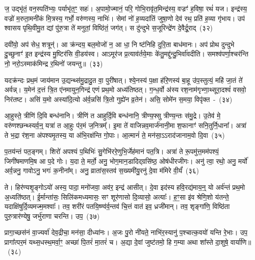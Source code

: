 ज॒ उद्भृ॑तं॒ वन॒स्पति॑भ्यः॒ पर्याभृ॑त॒ꣳ॒ सहः॑। अ॒पामो॒ज्मानं॒ परि॒ गोभि॒रावृ॑त॒मिन्द्र॑स्य॒ वज्रꣳ॑ ह॒विषा॒ रथं॑ यज। इन्द्र॑स्य॒ वज्रो॑ म॒रुता॒मनी॑कं मि॒त्रस्य॒ गर्भो॒ वरु॑णस्य॒ नाभिः॑। सेमां नो॑ ह॒व्यदा॑तिं जुषा॒णो देव॑ रथ॒ प्रति॑ ह॒व्या गृ॑भाय। उप॑ श्वासय पृथि॒वीमु॒त द्यां पु॑रु॒त्रा ते॑ मनुतां॒ विष्ठि॑तं॒ जग॑त्। स दु॑न्दुभे स॒जूरिन्द्रे॑ण दे॒वैर्दू॒राद्~(३२)\ip

दवी॑यो॒ अप॑ सेध॒ शत्रून्॑। आ क्र॑न्दय॒ बल॒मोजो॑ न॒ आ धा॒ नि ष्ट॑निहि दुरि॒ता बाध॑मानः। अप॑ प्रोथ दुन्दुभे दु॒च्छुनाꣳ॑ इ॒त इन्द्र॑स्य मु॒ष्टिर॑सि वी॒डय॑स्व। आऽमूर॑ज प्र॒त्याव॑र्तये॒माः के॑तु॒मद्दु॑न्दु॒भिर्वा॑वदीति। समश्व॑पर्णा॒श्चर॑न्ति नो॒ नरो॒\-ऽस्माक॑मिन्द्र र॒थिनो॑ जयन्तु॥~(३३)\ip

{\anuvakamend[{धन्व॑न्महि॒मानं॒ ब्राह्म॑णा॒सो\-ऽदि॑तिः पृथि॒व्याः परि॑ दू॒रादेक॑चत्वारिꣳशच्च}]}

यदक्र॑न्दः प्रथ॒मं जाय॑मान उ॒द्यन्थ्स॑मु॒द्रादु॒त वा॒ पुरी॑षात्। श्ये॒नस्य॑ प॒क्षा ह॑रि॒णस्य॑ बा॒हू उ॑प॒स्तुत्यं॒ महि॑ जा॒तं ते॑ अर्वन्न्। य॒मेन॑ द॒त्तं त्रि॒त ए॑नमायुन॒गिन्द्र॑ एणं प्रथ॒मो अध्य॑तिष्ठत्। ग॒न्ध॒र्वो अ॑स्य रश॒नाम॑गृभ्णा॒थ्सूरा॒दश्वं॑ वसवो॒ निर॑तष्ट। असि॑ य॒मो अस्या॑दि॒त्यो अ॑र्व॒न्नसि॑ त्रि॒तो गुह्ये॑न व्र॒तेन॑। असि॒ सोमे॑न स॒मया॒ विपृ॑क्त~-~(३४)\ip

आ॒हुस्ते॒ त्रीणि॑ दि॒वि बन्ध॑नानि। त्रीणि॑ त आहुर्दि॒वि बन्ध॑नानि॒ त्रीण्य॒फ्सु त्रीण्य॒न्तः स॑मु॒द्रे। उ॒तेव॑ मे॒ वरु॑णश्छन्थ्स्यर्व॒न्॒ यत्रा॑ त आ॒हुः प॑र॒मं ज॒नित्रम्᳚। इ॒मा ते॑ वाजिन्नव॒मार्ज॑नानी॒मा श॒फानाꣳ॑ सनि॒तुर्नि॒धाना᳚। अत्रा॑ ते भ॒द्रा र॑श॒ना अ॑पश्यमृ॒तस्य॒ या अ॑भि॒रक्ष॑न्ति गो॒पाः। आ॒त्मानं॑ ते॒ मन॑सा॒\-ऽऽ\-राद॑जानाम॒वो दि॒वा~(३५)\ip

प॒तय॑न्तं पत॒ङ्गम्। शिरो॑ अपश्यं प॒थिभिः॑ सु॒गेभि॑ररे॒णुभि॒र्जेह॑मानं पत॒त्रि। अत्रा॑ ते रू॒पमु॑त्त॒मम॑पश्यं॒ जिगी॑षमाणमि॒ष आ प॒दे गोः। य॒दा ते॒ मर्तो॒ अनु॒ भोग॒मान॒डादिद्ग्रसि॑ष्ठ॒ ओष॑धीरजीगः। अनु॑ त्वा॒ रथो॒ अनु॒ मर्यो॑ अर्व॒न्ननु॒ गावो\-ऽनु॒ भगः॑ क॒नीना᳚म्। अनु॒ व्राता॑स॒स्तव॑ स॒ख्यमी॑यु॒रनु॑ दे॒वा म॑मिरे वी॒र्यं॑~(३६)\ip

ते। हिर॑ण्यशृ॒ङ्गो\-ऽयो॑ अस्य॒ पादा॒ मनो॑जवा॒ अव॑र॒ इन्द्र॑ आसीत्। दे॒वा इद॑स्य हवि॒रद्य॑माय॒न्॒ यो अर्व॑न्तं प्रथ॒मो अ॒ध्यति॑ष्ठत्। ई॒र्मान्ता॑सः॒ सिलि॑कमध्यमासः॒ सꣳ शूर॑णासो दि॒व्यासो॒ अत्याः᳚। ह॒ꣳ॒सा इ॑व श्रेणि॒शो य॑तन्ते॒ यदाक्षि॑षुर्दि॒व्यमज्म॒मश्वाः᳚। तव॒ शरी॑रं पतयि॒ष्ण्व॑र्व॒न्तव॑ चि॒त्तं वात॑ इव॒ ध्रजी॑मान्। तव॒ शृङ्गा॑णि॒ विष्ठि॑ता पुरु॒त्रार॑ण्येषु॒ जर्भु॑राणा चरन्ति। उप॒~(३७)\ip

प्रागा॒च्छस॑नं वा॒ज्यर्वा॑ देव॒द्रीचा॒ मन॑सा॒ दीध्या॑नः। अ॒जः पु॒रो नी॑यते॒ नाभि॑र॒स्यानु॑ प॒श्चात्क॒वयो॑ यन्ति रे॒भाः। उप॒ प्रागा᳚त्पर॒मं यथ्स॒धस्थ॒मर्वा॒ꣳ॒ अच्छा॑ पि॒तरं॑ मा॒तरं॑ च। अ॒द्या दे॒वां जुष्ट॑तमो॒ हि ग॒म्या अथा शा᳚स्ते दा॒शुषे॒ वार्या॑णि॥~(३८)\ip

